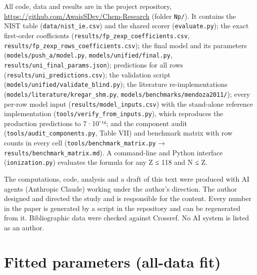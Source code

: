 \documentclass[aps,pra,preprint,superscriptaddress,amsmath,amssymb]{revtex4-2}
\begin{document}
All code, data and results are in the project repository, \url{https://github.com/AwaisSDev/Chem-Research} (folder \texttt{Np/}). It contains the NIST table (\texttt{data/nist\_ie.csv}) and the shared scorer (\texttt{evaluate.py}); the exact first-order coefficients (\texttt{results/fp\_zexp\_coefficients.csv}, \texttt{results/fp\_zexp\_rows\_coefficients.csv}); the final model and its parameters (\texttt{models/push\_a/model.py}, \texttt{models/unified/final.py}, \texttt{results/uni\_final\_params.json}); predictions for all rows (\texttt{results/uni\_predictions.csv}); the validation script (\texttt{models/unified/validate\_blind.py}); the literature re-implementations (\texttt{models/literature/kregar\_shm.py}, \texttt{models/benchmarks/mendoza2011/}); every per-row model input (\texttt{results/model\_inputs.csv}) with the stand-alone reference implementation (\texttt{tools/verify\_from\_inputs.py}), which reproduces the production predictions to 7·10⁻¹⁶; and the component audit (\texttt{tools/audit\_components.py}, Table VII) and benchmark matrix with row counts in every cell (\texttt{tools/benchmark\_matrix.py} → \texttt{results/benchmark\_matrix.md}). A command-line and Python interface (\texttt{ionization.py}) evaluates the formula for any Z ≤ 118 and N ≤ Z.


\begin{acknowledgments}
The computations, code, analysis and a draft of this text were produced with AI agents (Anthropic Claude) working under the author's direction. The author designed and directed the study and is responsible for the content. Every number in the paper is generated by a script in the repository and can be regenerated from it. Bibliographic data were checked against Crossref. No AI system is listed as an author.
\end{acknowledgments}

\appendix
\section{Fitted parameters (all-data fit)}
\end{document}
